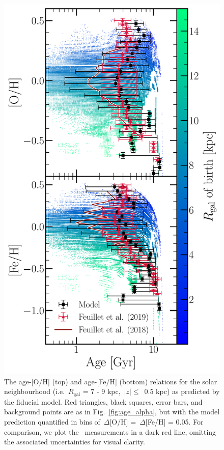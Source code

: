\documentclass[draft2.tex]{subfiles}
\begin{document}
\begin{figure} 
\centering 
\includegraphics[scale = 0.44]{amr_solar_annulus.pdf} 
\caption{The age-[O/H] (top) and age-[Fe/H] (bottom) relations for the solar 
neighbourhood (i.e.~$R_\text{gal}$ = 7 - 9 kpc,~$\left|z\right|\leq$~0.5 kpc) 
as predicted by the fiducial model. Red triangles, black squares, error bars, 
and background points are as in Fig.~\ref{fig:age_alpha}, but with the model 
prediction quantified in bins of~$\Delta$[O/H] =~$\Delta$[Fe/H] = 0.05. For 
comparison, we plot the~\citet{Feuillet2018} measurements in a dark red line, 
omitting the associated uncertainties for visual clarity. } 
\label{fig:amr_solar_annulus} 
\end{figure} 
\end{document}
